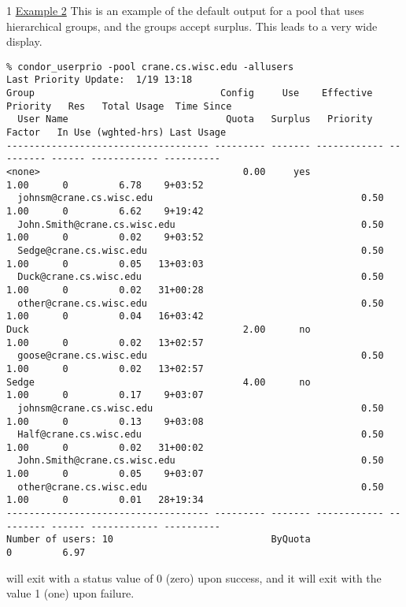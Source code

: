 \begin{ManPage}{\label{man-condor-userprio}}{1}
\underline{Example 2} This is an example of the default output for a pool
that uses hierarchical groups, and the groups accept surplus.
This leads to a very wide display.
\scriptsize
\begin{verbatim}
% condor_userprio -pool crane.cs.wisc.edu -allusers
Last Priority Update:  1/19 13:18
Group                                 Config     Use    Effective   Priority   Res   Total Usage  Time Since
  User Name                            Quota   Surplus   Priority    Factor   In Use (wghted-hrs) Last Usage
------------------------------------ --------- ------- ------------ --------- ------ ------------ ----------
<none>                                    0.00     yes                   1.00      0         6.78    9+03:52
  johnsm@crane.cs.wisc.edu                                     0.50      1.00      0         6.62    9+19:42
  John.Smith@crane.cs.wisc.edu                                 0.50      1.00      0         0.02    9+03:52
  Sedge@crane.cs.wisc.edu                                      0.50      1.00      0         0.05   13+03:03
  Duck@crane.cs.wisc.edu                                       0.50      1.00      0         0.02   31+00:28
  other@crane.cs.wisc.edu                                      0.50      1.00      0         0.04   16+03:42
Duck                                      2.00      no                   1.00      0         0.02   13+02:57
  goose@crane.cs.wisc.edu                                      0.50      1.00      0         0.02   13+02:57
Sedge                                     4.00      no                   1.00      0         0.17    9+03:07
  johnsm@crane.cs.wisc.edu                                     0.50      1.00      0         0.13    9+03:08
  Half@crane.cs.wisc.edu                                       0.50      1.00      0         0.02   31+00:02
  John.Smith@crane.cs.wisc.edu                                 0.50      1.00      0         0.05    9+03:07
  other@crane.cs.wisc.edu                                      0.50      1.00      0         0.01   28+19:34
------------------------------------ --------- ------- ------------ --------- ------ ------------ ----------
Number of users: 10                            ByQuota                             0         6.97 
\end{verbatim}
\normalsize

\ExitStatus

 will exit with a status value of 0 (zero) upon success,
and it will exit with the value 1 (one) upon failure.

\end{ManPage}
